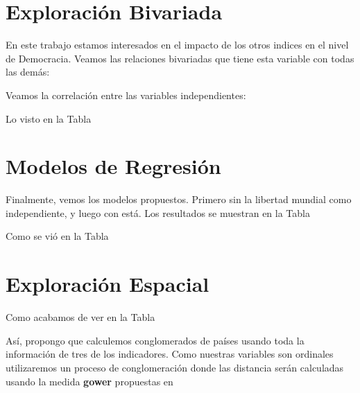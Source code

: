 \documentclass{article}
\begin{document}
\section{Exploración Bivariada}

En este trabajo estamos interesados en el impacto de los otros indices en el nivel de Democracia. Veamos las relaciones bivariadas que tiene esta variable con todas las demás:




Veamos la correlación entre las variables independientes:




Lo visto en la Tabla %




\clearpage

\section{Modelos de Regresión}

Finalmente, vemos los modelos propuestos. Primero sin la libertad mundial como independiente, y luego con está. Los resultados se muestran en la Tabla %





Como se vió en la Tabla %

\clearpage

\section{Exploración Espacial}

Como acabamos de ver en la Tabla %

Así, propongo que calculemos conglomerados de países usando toda la información de tres de los indicadores. Como nuestras variables son ordinales utilizaremos un proceso de conglomeración donde las distancia serán calculadas usando la medida {\bf gower} propuestas en %






%
%
\end{document}
